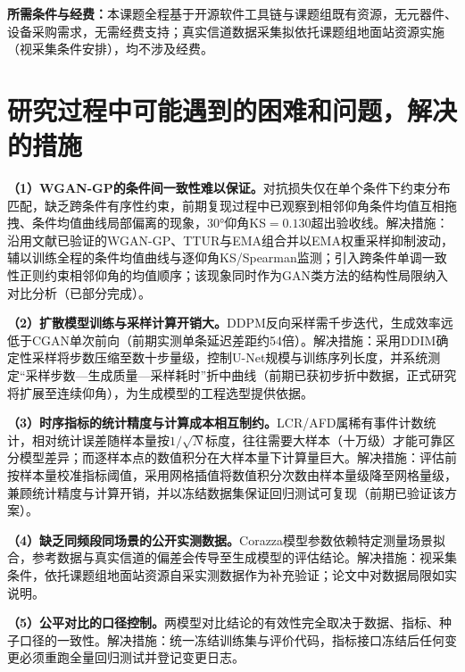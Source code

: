 \documentclass[12pt, a4paper]{ctexart}
\begin{document}
\textbf{所需条件与经费：}本课题全程基于开源软件工具链与课题组既有资源，无元器件、设备采购需求，无需经费支持；真实信道数据采集拟依托课题组地面站资源实施（视采集条件安排），均不涉及经费。

\section{研究过程中可能遇到的困难和问题，解决的措施}

\textbf{（1）WGAN-GP的条件间一致性难以保证。}对抗损失仅在单个条件下约束分布匹配，缺乏跨条件有序性约束，前期复现过程中已观察到相邻仰角条件均值互相拖拽、条件均值曲线局部偏离的现象，30°仰角KS$=0.130$超出验收线。解决措施：沿用文献\cite{chen2026cgan}已验证的WGAN-GP、TTUR与EMA组合并以EMA权重采样抑制波动，辅以训练全程的条件均值曲线与逐仰角KS/Spearman监测；引入跨条件单调一致性正则约束相邻仰角的均值顺序；该现象同时作为GAN类方法的结构性局限纳入对比分析（已部分完成）。

\textbf{（2）扩散模型训练与采样计算开销大。}DDPM反向采样需千步迭代，生成效率远低于CGAN单次前向（前期实测单条延迟差距约54倍）。解决措施：采用DDIM确定性采样将步数压缩至数十步量级，控制U-Net规模与训练序列长度，并系统测定“采样步数—生成质量—采样耗时”折中曲线（前期已获初步折中数据，正式研究将扩展至连续仰角），为生成模型的工程选型提供依据。

\textbf{（3）时序指标的统计精度与计算成本相互制约。}LCR/AFD属稀有事件计数统计，相对统计误差随样本量按$1/\sqrt{N}$标度，往往需要大样本（十万级）才能可靠区分模型差异；而逐样本点的数值积分在大样本量下计算量巨大。解决措施：评估前按样本量校准指标阈值，采用网格插值将数值积分次数由样本量级降至网格量级，兼顾统计精度与计算开销，并以冻结数据集保证回归测试可复现（前期已验证该方案）。

\textbf{（4）缺乏同频段同场景的公开实测数据。}Corazza模型参数依赖特定测量场景拟合，参考数据与真实信道的偏差会传导至生成模型的评估结论。解决措施：视采集条件，依托课题组地面站资源自采实测数据作为补充验证；论文中对数据局限如实说明。

\textbf{（5）公平对比的口径控制。}两模型对比结论的有效性完全取决于数据、指标、种子口径的一致性。解决措施：统一冻结训练集与评价代码，指标接口冻结后任何变更必须重跑全量回归测试并登记变更日志。

\end{document}
